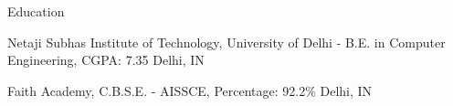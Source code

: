\documentclass[../resume.tex]{subfiles}
\begin{document}

\begin{rSection}{ Education }

    \rSubsectionHeading
        {Netaji Subhas Institute of Technology, \nem University of Delhi}
        {  -  }
        {\normalfont B.E. in Computer Engineering, CGPA: 7.35}
        {Delhi, IN}

    \rSubsectionHeading
        {Faith Academy, \nem C.B.S.E.}
        {  -  }
        {\normalfont AISSCE, Percentage: 92.2\%}
        {Delhi, IN}

\end{rSection}
\end{document}
